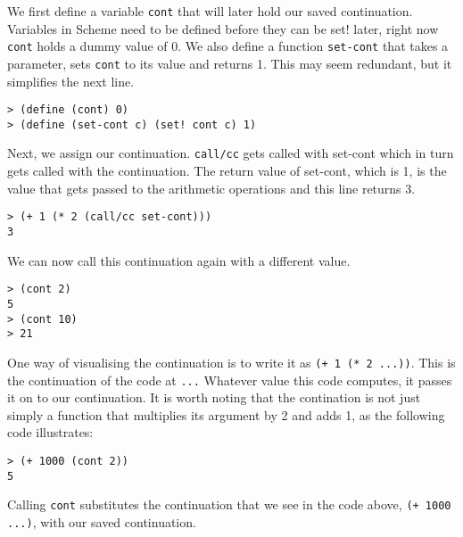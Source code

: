 \documentclass[11pt]{report}
\begin{document}
We first define a variable \texttt{cont} that will later hold our saved continuation. Variables in Scheme need to be defined before they can be set! later, right now \texttt{cont} holds a dummy value of 0. We also define a function \texttt{set-cont} that takes a parameter, sets \texttt{cont} to its value and returns 1. This may seem redundant, but it simplifies the next line.
\begin{lstlisting}
> (define (cont) 0)
> (define (set-cont c) (set! cont c) 1)
\end{lstlisting}

Next, we assign our continuation. \texttt{call/cc} gets called with set-cont which in turn gets called with the continuation. The return value of set-cont, which is 1, is the value that gets passed to the arithmetic operations and this line returns 3.
\begin{lstlisting}
> (+ 1 (* 2 (call/cc set-cont)))
3
\end{lstlisting}

We can now call this continuation again with a different value.
\begin{lstlisting}
> (cont 2)
5
> (cont 10)
> 21
\end{lstlisting}

One way of visualising the continuation is to write it as \texttt{(+ 1 (* 2 ...))}. This is the continuation of the code at \texttt{...} Whatever value this code computes, it passes it on to our continuation. It is worth noting that the contination is not just simply a function that multiplies its argument by 2 and adds 1, as the following code illustrates:
\begin{lstlisting}
> (+ 1000 (cont 2))
5
\end{lstlisting}

Calling \texttt{cont} substitutes the continuation that we see in the code above, \texttt{(+ 1000 ...)}, with our saved continuation.
\end{document}
